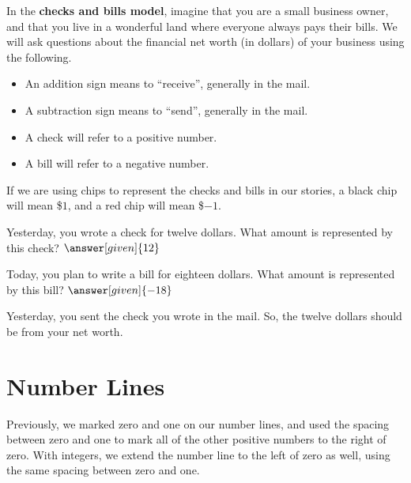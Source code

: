 \documentclass{ximera}
\begin{document}
\begin{definition}
In the \textbf{checks and bills model}, imagine that you are a small business owner, and that you live in a wonderful land where everyone always pays their bills.  We will ask questions about the financial net worth (in dollars) of your business using the following.
\begin{itemize}
	\item An addition sign means to ``receive'', generally in the mail.
	\item A subtraction sign means to ``send'', generally in the mail.
	\item A check will refer to a positive number.
	\item A bill will refer to a negative number.
\end{itemize}
\end{definition}

If we are using chips to represent the checks and bills in our stories, a black chip will mean \$$1$, and a red chip will mean \$$-1$.

\begin{example}
Yesterday, you wrote a check for twelve dollars.  What amount is represented by this check?  $\answer[given]{12}$

Today, you plan to write a bill for eighteen dollars.  What amount is represented by this bill?  $\answer[given]{-18}$

Yesterday, you sent the check you wrote in the mail.  So, the twelve dollars should be  from your net worth.
\end{example}

\section{Number Lines}

Previously, we marked zero and one on our number lines, and used the spacing between zero and one to mark all of the other positive numbers to the right of zero.  With integers, we extend the number line to the left of zero as well, using the same spacing between zero and one.
\begin{center}
\end{center}
\end{document}
